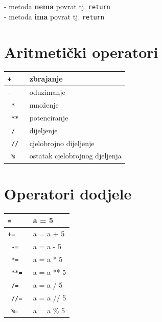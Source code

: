 \documentclass[10pt]{article}
\begin{document}
    \begin{center}
         - metoda \textbf{nema} povrat tj. \texttt{return}
        \\
         - metoda \textbf{ima} povrat tj. \texttt{return}
        \\
    \end{center}

    \section*{\color{NavyBlue} Aritmetički operatori}
    \begin{tabular}{|>{\tt}p{9.00cm}|>{}p{15.50cm}|}
        \hline
        +  & zbrajanje                      \\ \hline
        -  & oduzimanje                     \\ \hline
        *  & množenje                       \\ \hline
        ** & potenciranje                   \\ \hline
        /  & dijeljenje                     \\ \hline
        // & cjelobrojno dijeljenje         \\ \hline
        \% & ostatak cjelobrojnog djeljenja \\ \hline
    \end{tabular}

    \section*{\color{NavyBlue} Operatori dodjele}
    \begin{tabular}{|>{\tt}p{9.00cm}|>{}p{15.50cm}|}
        \hline
        =   & a = 5             \\ \hline
        +=  & a = a + 5         \\ \hline
        -=  & a = a - 5         \\ \hline
        *=  & a = a * 5         \\ \hline
        **= & a = a ** 5        \\ \hline
        /=  & a = a / 5         \\ \hline
        //= & a = a // 5        \\ \hline
        \%= & a = a \% 5        \\ \hline
    \end{tabular}
\end{document}
